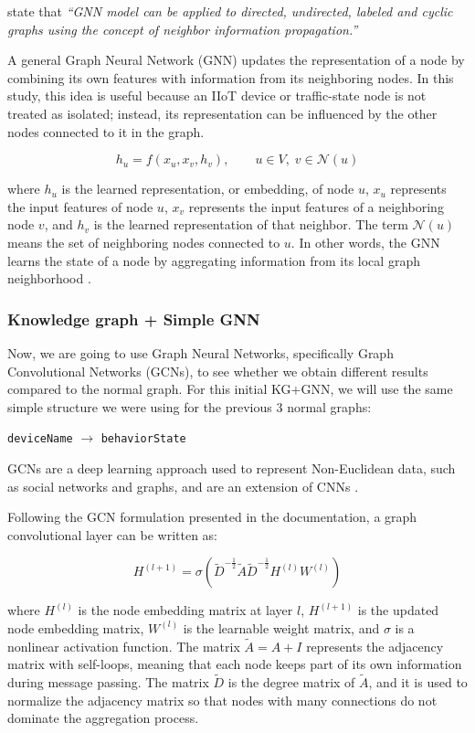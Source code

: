 \documentclass[final,5p,times,twocolumn]{elsarticle}
\begin{document}
\citet[p.~49118]{bilot2023graph} state that \textit{``GNN model can be applied to directed, undirected, labeled and cyclic graphs using the concept of neighbor information propagation.''}

A general Graph Neural Network (GNN) updates the representation of a node by combining its own features with information from its neighboring nodes. In this study, this idea is useful because an IIoT device or traffic-state node is not treated as isolated; instead, its representation can be influenced by the other nodes connected to it in the graph.

\[
h_u = f(x_u, x_v, h_v), \qquad u \in V,\; v \in \mathcal{N}(u)
\]

where \(h_u\) is the learned representation, or embedding, of node \(u\), \(x_u\) represents the input features of node \(u\), \(x_v\) represents the input features of a neighboring node \(v\), and \(h_v\) is the learned representation of that neighbor. The term \(\mathcal{N}(u)\) means the set of neighboring nodes connected to \(u\). In other words, the GNN learns the state of a node by aggregating information from its local graph neighborhood \citep{bilot2023graph}.

\subsubsection{Knowledge graph + Simple GNN}
\label{Knowledge graph + Simple GNN}
Now, we are going to use Graph Neural Networks, specifically Graph Convolutional Networks (GCNs), to see whether we obtain different results compared to the normal graph. For this initial KG+GNN, we will use the same simple structure we were using for the previous 3 normal graphs:

\begin{center}
\texttt{deviceName} \(\rightarrow\) \texttt{behaviorState}
\end{center}

GCNs are a deep learning approach used to represent Non-Euclidean data, such as social networks and graphs, and are an extension of CNNs \citep{jiang2019anomaly}.


Following the GCN formulation presented in the \cite{dgl_gcn_tutorial} documentation, a graph convolutional layer can be written as:

\[
H^{(l+1)}
=
\sigma
\left(
\tilde{D}^{-\frac{1}{2}}
\tilde{A}
\tilde{D}^{-\frac{1}{2}}
H^{(l)}
W^{(l)}
\right)
\]

where \(H^{(l)}\) is the node embedding matrix at layer \(l\), \(H^{(l+1)}\) is the updated node embedding matrix, \(W^{(l)}\) is the learnable weight matrix, and \(\sigma\) is a nonlinear activation function. The matrix \(\tilde{A} = A + I\) represents the adjacency matrix with self-loops, meaning that each node keeps part of its own information during message passing. The matrix \(\tilde{D}\) is the degree matrix of \(\tilde{A}\), and it is used to normalize the adjacency matrix so that nodes with many connections do not dominate the aggregation process.
\end{document}
